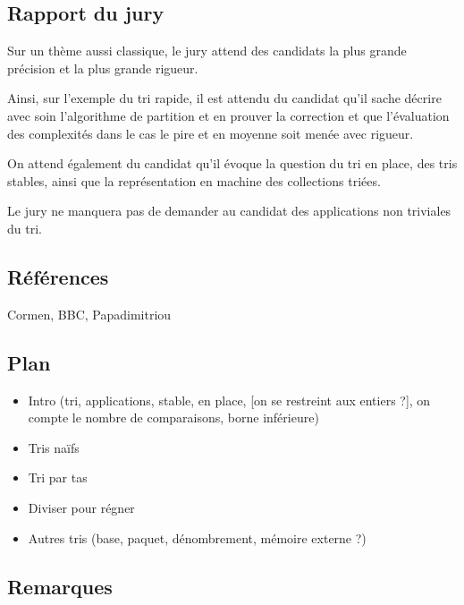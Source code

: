 \documentclass[../../agregation.tex]{subfiles}
\begin{document}

\subsection{Rapport du jury}

\begin{aquote}{}
Sur un thème aussi classique, le jury attend des candidats la plus grande précision et la plus grande rigueur.

Ainsi, sur l'exemple du tri rapide, il est attendu du candidat qu'il sache décrire avec soin l'algorithme de partition et en prouver la correction et que l'évaluation des complexités dans le cas le pire et en moyenne soit menée avec rigueur.

On attend également du candidat qu'il évoque la question du tri en place, des tris stables, ainsi que la représentation en machine des collections triées.

Le jury ne manquera pas de demander au candidat des applications non triviales du tri.
\end{aquote}

\dvts

\subsection{Références}

Cormen, BBC, Papadimitriou

\subsection{Plan}

\begin{itemize}
	\item Intro (tri, applications, stable, en place, [on se restreint aux entiers ?], on compte le nombre de comparaisons, borne inférieure)
	\item Tris naïfs
	\item Tri par tas
	\item Diviser pour régner
	\item Autres tris (base, paquet, dénombrement, mémoire externe ?)
\end{itemize}

\subsection{Remarques}
\end{document}
